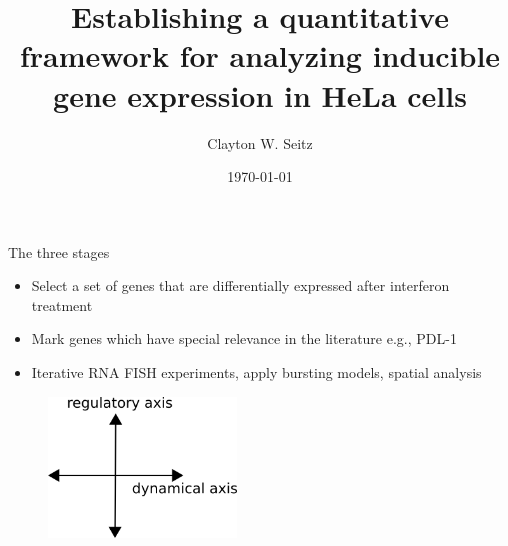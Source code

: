 \documentclass[aspectratio=1610]{beamer}					%
\title{Establishing a quantitative framework for analyzing inducible gene expression in HeLa cells}	%
\author{Clayton W. Seitz}								%
\date{\today}									%
\begin{document}
\begin{frame}
  \titlepage
\end{frame}


%

\begin{frame}{The three stages}
\begin{itemize}
\item Select a set of genes that are differentially expressed after interferon treatment
\item Mark genes which have special relevance in the literature e.g., PDL-1
\item Iterative RNA FISH experiments, apply bursting models, spatial analysis
\end{itemize}
\vspace{0.2in}
\begin{figure}
\includegraphics[width=5cm]{axes.png}
\end{figure}

\end{frame}
\end{document}
